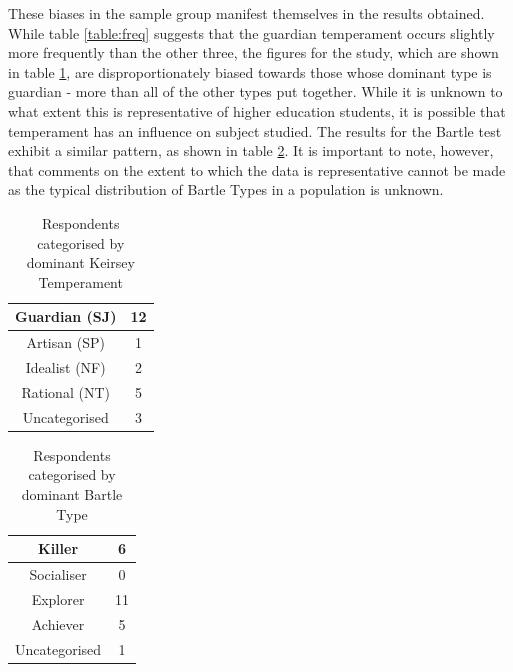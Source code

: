 \documentclass[12pt,a4paper,twoside]{report}
\begin{document}
These biases in the sample group manifest themselves in the results obtained. While table \ref{table:freq} suggests that the guardian temperament occurs slightly more frequently than the other three, the figures for the study, which are shown in table \ref{table:kfreq}, are disproportionately biased towards those whose dominant type is guardian - more than all of the other types put together. While it is unknown to what extent this is representative of higher education students, it is possible that temperament has an influence on subject studied. The results for the Bartle test exhibit a similar pattern, as shown in table \ref{table:bfreq}. It is important to note, however, that comments on the extent to which the data is representative cannot be made as the typical distribution of Bartle Types in a population is unknown.

\begin{table}
\begin{center}
\begin{tabular}{|c|c|}
	\hline Guardian (SJ) & 12 \\ 
	\hline Artisan (SP) & 1 \\ 
	\hline Idealist (NF) & 2 \\ 
	\hline Rational (NT) & 5 \\ 
	\hline Uncategorised & 3 \\ 
	\hline 
\end{tabular}
\end{center}
\caption{Respondents categorised by dominant Keirsey Temperament}
\label{table:kfreq}
\end{table}

\begin{table}
	\begin{center}
		\begin{tabular}{|c|c|}
			\hline Killer & 6 \\ 
			\hline Socialiser & 0 \\ 
			\hline Explorer & 11 \\ 
			\hline Achiever & 5 \\ 
			\hline Uncategorised & 1 \\ 
			\hline 
		\end{tabular}
	\end{center}
	\caption{Respondents categorised by dominant Bartle Type}
	\label{table:bfreq}
\end{table}
\end{document}

